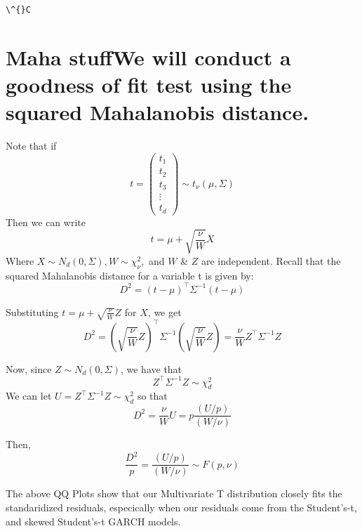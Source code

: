 \documentclass[11pt]{article}
\begin{document}
    \begin{Verbatim}[commandchars=\\\{\}]
\^{}C
    \end{Verbatim}

    \section{Maha stuffWe will conduct a goodness of fit test using the
squared Mahalanobis
distance.}\label{maha-stuffwe-will-conduct-a-goodness-of-fit-test-using-the-squared-mahalanobis-distance.}

    Note that if \[t=\begin{pmatrix}
t_1 \\
t_2 \\
t_3 \\
\vdots \\
t_d
\end{pmatrix}
\sim t_{\nu} (\mu,\Sigma)\] Then we can write
\[t = \mu + \sqrt{\frac{\nu}{W}} X\] Where
\(X\sim N_d(0,\Sigma), W \sim \chi^2_\nu,\) and \(W\) \& \(Z\) are
independent. Recall that the squared Mahalanobis distance for a variable
t is given by: \[D^2 = (t-\mu)^\top \Sigma^{-1}(t-\mu)\]

Substituting \(t = \mu + \sqrt{\frac{\nu}{W}} Z\) for \(X\), we get
\[D^2 = \left(\sqrt{\frac{\nu}{W}}Z\right)^\top \Sigma^{-1}\left(\sqrt{\frac{\nu}{W}}Z\right)= \frac{\nu}{W} Z^\top \Sigma^{-1} Z\]

Now, since \(Z\sim N_d(0,\Sigma)\), we have that
\[Z^\top \Sigma^{-1} Z\sim \chi^2_d\] We can let
\(U= Z^\top \Sigma^{-1} Z\sim \chi^2_d\) so that
\[D^2 = \frac{\nu}{W}U = p\frac{(U/p)}{(W/\nu)}\]

Then, \[\frac{D^2}{p} =\frac{(U/p)}{(W/\nu)} \sim F(p,\nu)\]

    The above QQ Plots show that our Multivariate T distribution closely
fits the standaridized residuals, especically when our residuals come
from the Student's-t, and skewed Student's-t GARCH models.
\end{document}
